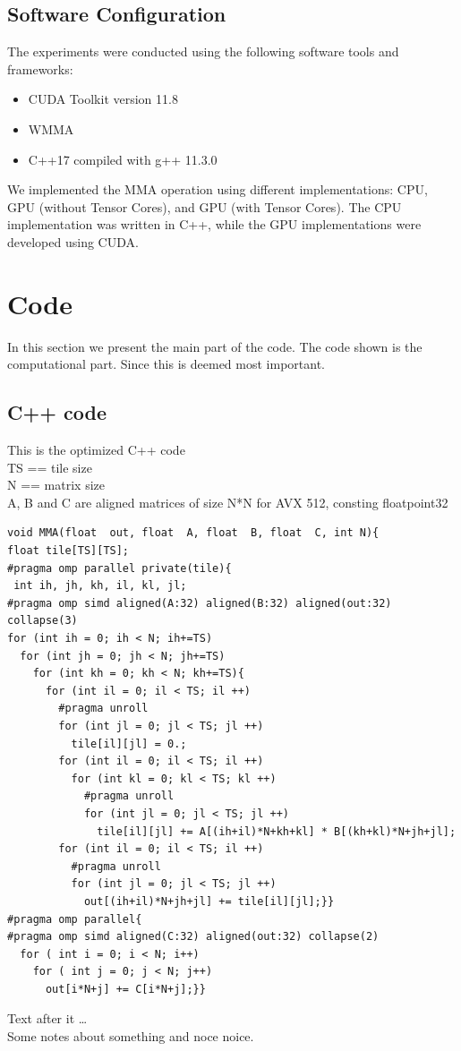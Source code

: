 \documentclass[conference]{IEEEtran}
\begin{document}
  \subsection{Software Configuration}\label{sec:software-configuration}
  
  The experiments were conducted using the following software tools and frameworks:
  
  \begin{itemize}
    \item CUDA Toolkit version 11.8
    \item WMMA
    \item C++17 compiled with g++ 11.3.0
  \end{itemize}
  
  We implemented the MMA operation using different implementations: CPU, GPU (without Tensor Cores), and GPU (with Tensor Cores). 
  The CPU implementation was written in C++, while the GPU implementations were developed using CUDA.

  
  \section{Code}
  In this section we present the main part of the code. The code shown is the computational part. Since this is
  deemed most important.

  \subsection{C++ code}\label{sec:CppCode}
  This is the optimized C++ code\\
  TS == tile size \\
  N == matrix size \\
  A, B and C are aligned matrices of size N*N for AVX 512, consting floatpoint32 
  
  \begin{lstlisting}
void MMA(float  out, float  A, float  B, float  C, int N){
float tile[TS][TS];
#pragma omp parallel private(tile){
 int ih, jh, kh, il, kl, jl;
#pragma omp simd aligned(A:32) aligned(B:32) aligned(out:32) collapse(3) 
for (int ih = 0; ih < N; ih+=TS)
  for (int jh = 0; jh < N; jh+=TS)
    for (int kh = 0; kh < N; kh+=TS){
      for (int il = 0; il < TS; il ++)
        #pragma unroll
        for (int jl = 0; jl < TS; jl ++)
          tile[il][jl] = 0.;
        for (int il = 0; il < TS; il ++)
          for (int kl = 0; kl < TS; kl ++)
            #pragma unroll
            for (int jl = 0; jl < TS; jl ++)
              tile[il][jl] += A[(ih+il)*N+kh+kl] * B[(kh+kl)*N+jh+jl];
        for (int il = 0; il < TS; il ++)
          #pragma unroll
          for (int jl = 0; jl < TS; jl ++)
            out[(ih+il)*N+jh+jl] += tile[il][jl];}}
#pragma omp parallel{
#pragma omp simd aligned(C:32) aligned(out:32) collapse(2)
  for ( int i = 0; i < N; i++)
    for ( int j = 0; j < N; j++)
      out[i*N+j] += C[i*N+j];}}
  \end{lstlisting}
  Text after it \dots \\
  Some notes about something and noce noice.
\end{document}
